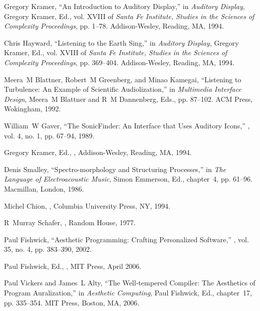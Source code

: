 \documentclass{article}
\begin{document}
 
\newcommand{\noopsort}[1]{} \newcommand{\singleletter}[1]{#1}
\begin{thebibliography}{10}

Gregory Kramer,
\newblock ``An Introduction to Auditory Display,''
\newblock in {\em Auditory Display}, Gregory Kramer, Ed., vol. XVIII of {\em
  Santa Fe Institute, Studies in the Sciences of Complexity Proceedings}, pp.
  1--78. Addison-Wesley, Reading, MA, 1994.

Chris Hayward,
\newblock ``Listening to the Earth Sing,''
\newblock in {\em Auditory Display}, Gregory Kramer, Ed., vol. XVIII of {\em
  Santa Fe Institute, Studies in the Sciences of Complexity Proceedings}, pp.
  369--404. Addison-Wesley, Reading, MA, 1994.

Meera~M Blattner, Robert~M Greenberg, and Minao Kamegai,
\newblock ``Listening to Turbulence: An Example of Scientific Audiolization,''
\newblock in {\em Multimedia Interface Design}, Meera~M Blattner and R~M
  Dannenberg, Eds., pp. 87--102. ACM Press, Wokingham, 1992.

William~W Gaver,
\newblock ``The SonicFinder: An Interface that Uses Auditory Icons,''
, vol. 4, no. 1, pp. 67--94, 1989.

Gregory Kramer, Ed.,
,
\newblock Addison-Wesley, Reading, MA, 1994.

Denis Smalley,
\newblock ``Spectro-morphology and Structuring Processes,''
\newblock in {\em The Language of Electroacoustic Music}, Simon Emmerson, Ed.,
  chapter~4, pp. 61--96. Macmillan, London, 1986.

Michel Chion,
,
\newblock Columbia University Press, NY, 1994.

R~Murray Schafer,
,
\newblock Random House, 1977.

Paul Fishwick,
\newblock ``Aesthetic Programming: Crafting Personalized Software,''
, vol. 35, no. 4, pp. 383--390, 2002.

Paul Fishwick, Ed.,
,
\newblock MIT Press, April 2006.

Paul Vickers and James~L Alty,
\newblock ``The Well-tempered Compiler: The Aesthetics of Program
  Auralization,''
\newblock in {\em Aesthetic Computing}, Paul Fishwick, Ed., chapter~17, pp.
  335--354. MIT Press, Boston, MA, 2006.


\end{thebibliography}
\end{document}
